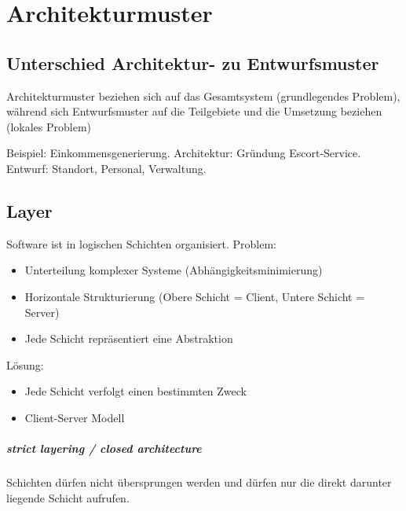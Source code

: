 {\let\clearpage\relax \chapter{Architekturmuster}\label{architekturmuster}}

\section{Unterschied Architektur- zu
Entwurfsmuster}\label{unterschied-architektur--zu-entwurfsmuster}

Architekturmuster beziehen sich auf das Gesamtsystem (grundlegendes
Problem), während sich Entwurfsmuster auf die Teilgebiete und die
Umsetzung beziehen (lokales Problem)

Beispiel: Einkommensgenerierung. Architektur: Gründung Escort-Service.
Entwurf: Standort, Personal, Verwaltung.

\section{Layer}\label{layer}

Software ist in logischen Schichten organisiert. Problem:

\begin{itemize}
\itemsep1pt\parskip0pt
\item
  Unterteilung komplexer Systeme (Abhängigkeitsminimierung)
\item
  Horizontale Strukturierung (Obere Schicht = Client, Untere Schicht =
  Server)
\item
  Jede Schicht repräsentiert eine Abstraktion
\end{itemize}

Lösung:

\begin{itemize}
\itemsep1pt\parskip0pt
\item
  Jede Schicht verfolgt einen bestimmten Zweck
\item
  Client-Server Modell
\end{itemize}

\paragraph{strict layering / closed
architecture}\label{strict-layering-closed-architecture}

Schichten dürfen nicht übersprungen werden und dürfen nur die direkt
darunter liegende Schicht aufrufen.

